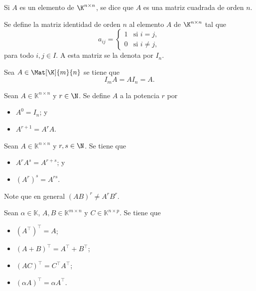 \documentclass[a4,11pt]{aleph-notas}
\begin{document}
\begin{defi}
    Si $A$ es un elemento de $\K^{n \times n}$, se dice que $A$ es una matriz cuadrada de orden $n$. 
\end{defi}

\begin{defi}
    Se define la matriz identidad de orden $n$ al elemento $A$ de $\K^{n \times n}$ tal que
    \[
        a_{ij} =
            \begin{cases}
            1 & \text{si } i=j, \\
            0 & \text{si } i \neq j,
            \end{cases}
    \]
    para todo $i,j\in I$. A esta matriz se la denota por $I_n$.
\end{defi} 

\begin{prop}
    Sea $A\in\Mat[\K]{m}{n}$ se tiene que
    \[ 
        I_m A = A I_n = A.
    \]
\end{prop}

\begin{defi}
    Sean $A \in \mathbb{K}^{n \times n}$ y $r\in\N$. Se define $A$ a la potencia $r$ por
    \begin{itemize}
    \item 
        $A^0 = I_n$; y
    \item 
        $A^{r+1} = A^rA$.
    \end{itemize}
\end{defi}

\begin{teo}
    Sean $A \in \mathbb{K}^{n \times n}$ y $r,s\in\N$. Se tiene que
    \begin{itemize}
    \item 
        $A^r A^s = A^{r+s}$; y 
    \item 
        $(A^r)^s = A^{rs}$.
    \end{itemize}
\end{teo}

\begin{advertencia}
    Note que en general $(AB)^r \neq A^r B^r$.
\end{advertencia}


\begin{teo}
    Sean $\alpha \in \mathbb{K}$, $A,B\in\mathbb{K}^{m \times n}$ y  $C\in\mathbb{K}^{n \times p}$. Se tiene que
    \begin{itemize}
    \item 
        $\left(A^\intercal\right)^\intercal = A$;
    \item 
        $(A+B)^\intercal = A^\intercal + B^\intercal$;
    \item 
        $(AC)^\intercal = C^\intercal A^\intercal$;
    \item 
        $(\alpha A)^\intercal = \alpha A^\intercal$.
    \end{itemize}
\end{teo}
\end{document}
